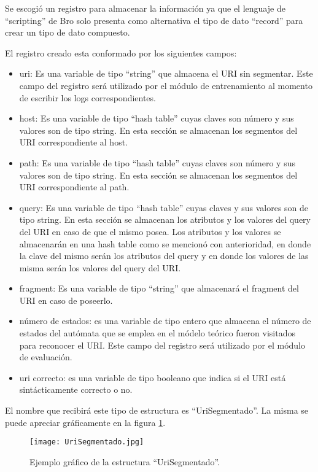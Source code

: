 Se escogió un registro para almacenar la información ya que el lenguaje de ``scripting'' de Bro solo presenta como alternativa el tipo de dato ``record'' para crear un tipo de dato compuesto. 

El registro creado esta conformado por los siguientes campos:
\begin{itemize}
\item uri: Es una variable de tipo ``string'' que almacena el URI sin segmentar. Este campo del registro será utilizado por el módulo de entrenamiento al momento de escribir los logs correspondientes.
\item host: Es una variable de tipo ``hash table'' cuyas claves son número y sus valores  son de tipo string. En esta sección se almacenan los segmentos del URI correspondiente al host.
\item path: Es una variable de tipo ``hash table'' cuyas claves son número y sus valores  son de tipo string. En esta sección se almacenan los segmentos del URI correspondiente al path.
\item query: Es una variable de tipo ``hash table'' cuyas claves y sus valores son de tipo string. En esta sección se almacenan los atributos y los valores del query del URI en caso de que el mismo posea. Los atributos y los valores se almacenarán en una hash table como se mencionó con anterioridad, en donde la clave del mismo serán los atributos del query y en donde los valores de las misma serán los valores del query del URI.
\item fragment: Es una variable de tipo ``string'' que almacenará el fragment del URI en caso de poseerlo.
\item número de estados: es una variable de tipo entero que almacena el número de estados del autómata que se emplea en el módelo teórico fueron visitados para reconocer el URI. Este campo del registro será utilizado por el módulo de evaluación.
\item uri correcto: es una variable de tipo booleano que indica si el URI está sintácticamente correcto o no.
\end{itemize}

El nombre que recibirá este tipo de estructura es ``UriSegmentado''. La misma se puede apreciar gráficamente en la figura \ref{fig:uriSegmentado}.

\begin{figure}[tb]
\begin{center}
\texttt{[image: UriSegmentado.jpg]}
\caption{Ejemplo gráfico de la estructura ``UriSegmentado''.}
\label{fig:uriSegmentado}
\end{center}
\end{figure}

